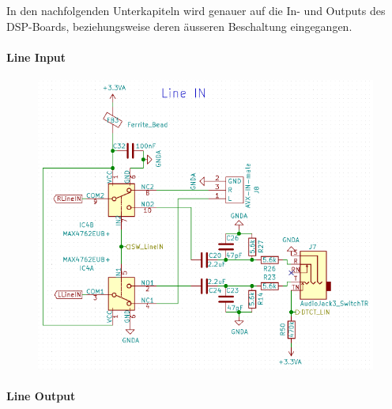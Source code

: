 In den nachfolgenden Unterkapiteln wird genauer auf die In- und Outputs des DSP-Boards, beziehungsweise deren äusseren Beschaltung eingegangen.


\paragraph{Line Input}
\label{par:LineIN}

\begin{figure} [H]
\begin{center}
 \includegraphics[scale=0.5]{../graphics/Schema_LineIN.png}
\caption{}
\label{fig:Schema_LineIN}
\end{center}
\end{figure}

\paragraph{Line Output}
\label{par:LineOUT}

